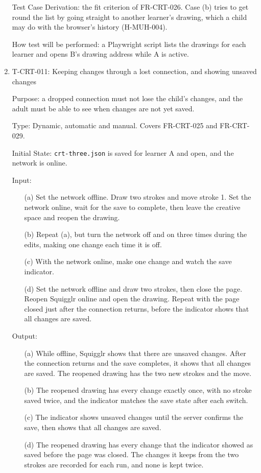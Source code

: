 \documentclass[12pt, titlepage]{article}
\newcommand{\testitem}[1]{\item #1\par\nopagebreak}
\begin{document}
\begin{enumerate}
Test Case Derivation: the fit criterion of FR-CRT-026. Case (b) tries to get
round the list by going straight to another learner's drawing, which a child
may do with the browser's history (H-MUH-004).

How test will be performed: a Playwright script lists the drawings for each
learner and opens B's drawing address while A is active.

\testitem{T-CRT-011: Keeping changes through a lost connection, and showing unsaved changes}

Purpose: a dropped connection must not lose the child's changes, and the
adult must be able to see when changes are not yet saved.

Type: Dynamic, automatic and manual. Covers FR-CRT-025 and FR-CRT-029.

Initial State: \texttt{crt-three.json} is saved for learner A and open, and
the network is online.

Input:
\begin{itemize}
\item[(a)] Set the network offline. Draw two strokes and move stroke 1. Set
the network online, wait for the save to complete, then leave the creative
space and reopen the drawing.
\item[(b)] Repeat (a), but turn the network off and on three times during the
edits, making one change each time it is off.
\item[(c)] With the network online, make one change and watch the save
indicator.
\item[(d)] Set the network offline and draw two strokes, then close the page.
Reopen Squigglr online and open the drawing. Repeat with the page closed
just after the connection returns, before the indicator shows that all
changes are saved.
\end{itemize}

Output:
\begin{itemize}
\item[(a)] While offline, Squigglr shows that there are unsaved changes. After
the connection returns and the save completes, it shows that all changes are
saved. The reopened drawing has the two new strokes and the move.
\item[(b)] The reopened drawing has every change exactly once, with no stroke
saved twice, and the indicator matches the save state after each switch.
\item[(c)] The indicator shows unsaved changes until the server confirms the
save, then shows that all changes are saved.
\item[(d)] The reopened drawing has every change that the indicator showed as
saved before the page was closed. The changes it keeps from the two strokes
are recorded for each run, and none is kept twice.
\end{itemize}


\end{enumerate}
\end{document}
